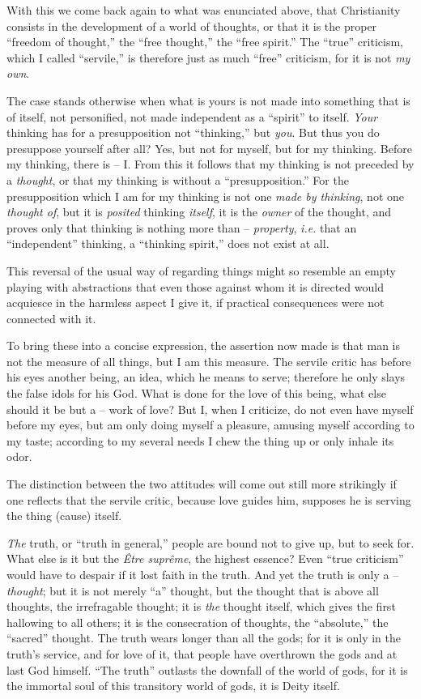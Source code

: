 With this we come back again to what was enunciated above, that Christianity 
consists in the development of a world of thoughts, or that it is the proper 
``freedom of thought,'' the ``free thought,'' the ``free spirit.'' The 
``true'' criticism, which I called ``servile,'' is therefore just as much 
``free'' criticism, for it is not \textit{my own}.

The case stands otherwise when what is yours is not made into something that 
is of itself, not personified, not made independent as a ``spirit'' to 
itself. \textit{Your} thinking has for a presupposition not ``thinking,'' 
but \textit{you}. But thus you do presuppose yourself after all? Yes, but not 
for myself, but for my thinking. Before my thinking, there is -- I. From this 
it follows that my thinking is not preceded by a \textit{thought}, or that my 
thinking is without a ``presupposition.'' For the presupposition which I am 
for my thinking is not one \textit{made by thinking}, not one \textit{thought 
of}, but it is \textit{posited} thinking \textit{itself}, it is the 
\textit{owner} of the thought, and proves only that thinking is nothing more 
than -- \textit{property}, \textit{i.e.} that an ``independent'' thinking, 
a ``thinking spirit,'' does not exist at all.

 This reversal of the usual way of regarding things might so resemble an empty 
playing with abstractions that even those against whom it is directed would 
acquiesce in the harmless aspect I give it, if practical consequences were not 
connected with it.

To bring these into a concise expression, the assertion now made is that man 
is not the measure of all things, but I am this measure. The servile critic 
has before his eyes another being, an idea, which he means to serve; therefore 
he only slays the false idols for his God. What is done for the love of this 
being, what else should it be but a -- work of love? But I, when I criticize, 
do not even have myself before my eyes, but am only doing myself a pleasure, 
amusing myself according to my taste; according to my several needs I chew the 
thing up or only inhale its odor.

The distinction between the two attitudes will come out still more strikingly 
if one reflects that the servile critic, because love guides him, supposes he 
is serving the thing (cause) itself.

\textit{The} truth, or ``truth in general,'' people are bound not to give 
up, but to seek for. What else is it but the \textit{\^Etre supr\^eme}, the 
highest essence? Even ``true criticism'' would have to despair if it lost 
faith in the truth. And yet the truth is only a -- \textit{thought}; but it is 
not merely ``a'' thought, but the thought that is above all thoughts, the 
irrefragable thought; it is \textit{the} thought itself, which gives the first 
hallowing to all others; it is the consecration of thoughts, the 
``absolute,'' the ``sacred'' thought. The truth wears longer than all the 
gods; for it is only in the truth's service, and for love of it, that people 
have overthrown the gods and at last God himself. ``The truth'' outlasts the 
downfall of the world of gods, for it is the immortal soul of this transitory 
world of gods, it is Deity itself.

